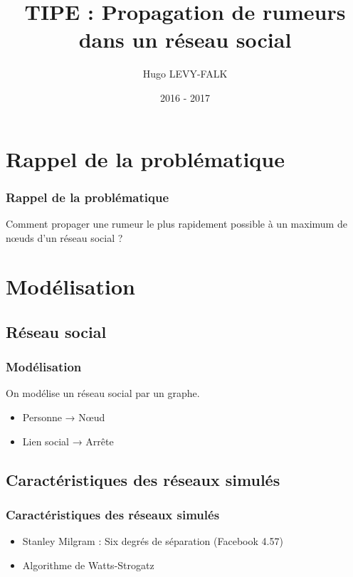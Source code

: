 \documentclass{beamer}
\title[Propagation de rumeurs dans un réseau social]{TIPE : Propagation de rumeurs dans un réseau social}
\author{Hugo LEVY-FALK}
\date{ 2016 - 2017 }
\begin{document}
\begin{frame}
  \titlepage
\end{frame}

\section{Rappel de la problématique}
\begin{frame}
  \frametitle{Rappel de la problématique}
  \begin{center}
  Comment propager une rumeur le plus rapidement possible à un maximum de nœuds d'un réseau social ?
  \end{center}
\end{frame}

\section{Modélisation}
\subsection{Réseau social}
\begin{frame}
  \frametitle{Modélisation}
  On modélise un réseau social par un graphe.
  \begin{itemize}
    \item<2-> Personne → Nœud
    \item<3-> Lien social → Arrête
  \end{itemize}
\end{frame}
\subsection{Caractéristiques des réseaux simulés}
\begin{frame}
  \frametitle{Caractéristiques des réseaux simulés}
  \begin{itemize}
    \item<2-> Stanley Milgram : Six degrés de séparation (Facebook 4.57)
    \item<3-> Algorithme de Watts-Strogatz
  \end{itemize}
\end{frame}
\end{document}
